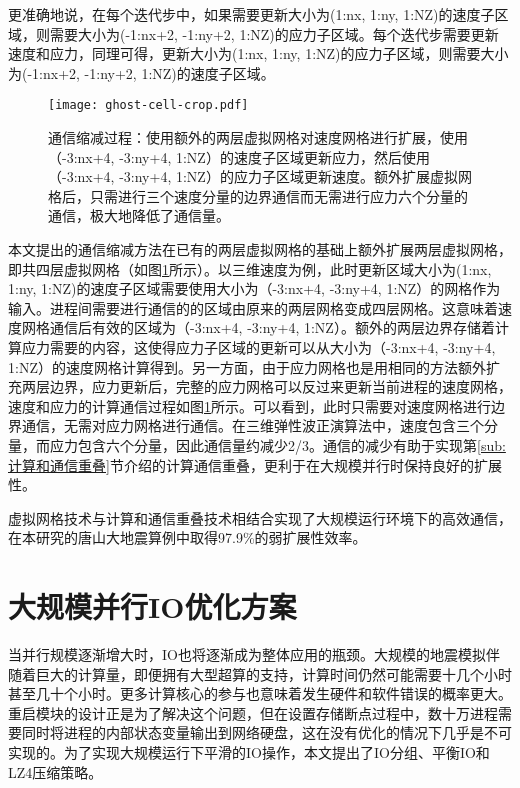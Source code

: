 更准确地说，在每个迭代步中，如果需要更新大小为(1:nx, 1:ny, 1:NZ)的速度子区域，则需要大小为(-1:nx+2, -1:ny+2, 1:NZ)的应力子区域。每个迭代步需要更新速度和应力，同理可得，更新大小为(1:nx, 1:ny, 1:NZ)的应力子区域，则需要大小为(-1:nx+2, -1:ny+2, 1:NZ)的速度子区域。

\begin{figure}[ht]
  \centering
  \texttt{[image: ghost-cell-crop.pdf]}
  \caption{通信缩减过程：使用额外的两层虚拟网格对速度网格进行扩展，使用（-3:nx+4, -3:ny+4, 1:NZ）的速度子区域更新应力，然后使用（-3:nx+4, -3:ny+4, 1:NZ）的应力子区域更新速度。额外扩展虚拟网格后，只需进行三个速度分量的边界通信而无需进行应力六个分量的通信，极大地降低了通信量。}
  \label{fig:ghost-cell}
\end{figure}

本文提出的通信缩减方法在已有的两层虚拟网格的基础上额外扩展两层虚拟网格，即共四层虚拟网格（如图\ref{fig:ghost-cell}所示）。以三维速度为例，此时更新区域大小为(1:nx, 1:ny, 1:NZ)的速度子区域需要使用大小为（-3:nx+4, -3:ny+4, 1:NZ）的网格作为输入。进程间需要进行通信的的区域由原来的两层网格变成四层网格。这意味着速度网格通信后有效的区域为（-3:nx+4, -3:ny+4, 1:NZ）。额外的两层边界存储着计算应力需要的内容，这使得应力子区域的更新可以从大小为（-3:nx+4, -3:ny+4, 1:NZ）的速度网格计算得到。另一方面，由于应力网格也是用相同的方法额外扩充两层边界，应力更新后，完整的应力网格可以反过来更新当前进程的速度网格，速度和应力的计算通信过程如图\ref{fig:ghost-cell}所示。可以看到，此时只需要对速度网格进行边界通信，无需对应力网格进行通信。在三维弹性波正演算法中，速度包含三个分量，而应力包含六个分量，因此通信量约减少2/3。通信的减少有助于实现第\ref{sub:计算和通信重叠}节介绍的计算通信重叠，更利于在大规模并行时保持良好的扩展性。

虚拟网格技术与计算和通信重叠技术相结合实现了大规模运行环境下的高效通信，在本研究的唐山大地震算例中取得97.9\%的弱扩展性效率。

\section{大规模并行IO优化方案}

当并行规模逐渐增大时，IO也将逐渐成为整体应用的瓶颈。大规模的地震模拟伴随着巨大的计算量，即便拥有大型超算的支持，计算时间仍然可能需要十几个小时甚至几十个小时。更多计算核心的参与也意味着发生硬件和软件错误的概率更大。重启模块的设计正是为了解决这个问题，但在设置存储断点过程中，数十万进程需要同时将进程的内部状态变量输出到网络硬盘，这在没有优化的情况下几乎是不可实现的。为了实现大规模运行下平滑的IO操作，本文提出了IO分组、平衡IO和LZ4压缩策略。

